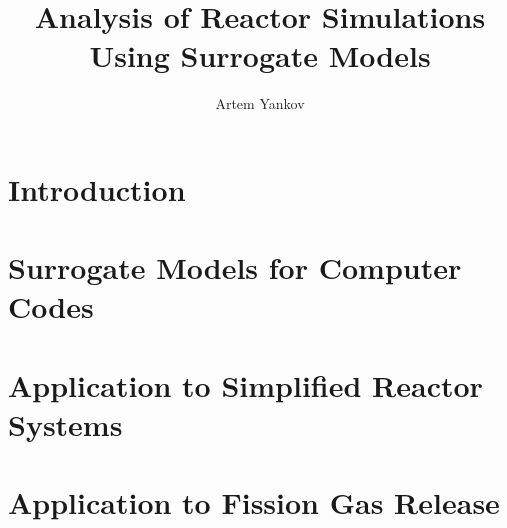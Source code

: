 \documentclass[thesis]{thesis-umich}
\title{Analysis of Reactor Simulations Using Surrogate Models}
\author{Artem Yankov}
\begin{document}
\chapter{Introduction}   \label{chap:intro}


\chapter{Surrogate Models for Computer Codes} \label{chap:rom}


\chapter{Application to Simplified Reactor Systems} \label{chap:applications}


%

\chapter{Application to Fission Gas Release} \label{chap:fgr}




\end{document}
